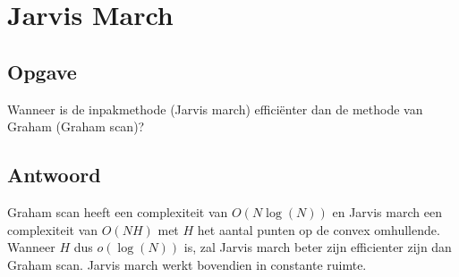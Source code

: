 \documentclass[examenvragen.tex]{subfiles}
\begin{document}
\section{Jarvis March}
\subsection{Opgave}
Wanneer is de inpakmethode (Jarvis march) effici\"enter dan de methode van Graham (Graham scan)?

\subsection{Antwoord}
Graham scan heeft een complexiteit van $O(N\log(N))$ en Jarvis march een complexiteit van $O(NH)$ met $H$ het aantal punten op de convex omhullende. Wanneer $H$ dus $o(\log(N))$ is, zal Jarvis march beter zijn efficienter zijn dan Graham scan. Jarvis march werkt bovendien in constante ruimte.
\end{document}
